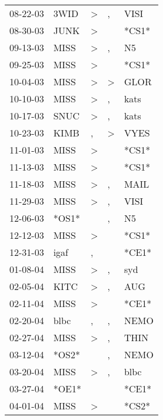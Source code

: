 \begin{supertabular}{lllll}
 08-22-03 &   3WID &     \textgreater &                , &   VISI \\
 08-30-03 &   JUNK &     \textgreater &                  &  *CS1* \\
 09-13-03 &   MISS &     \textgreater &                , &     N5 \\
 09-25-03 &   MISS &     \textgreater &                  &  *CS1* \\
 10-04-03 &   MISS &     \textgreater &     \textgreater &   GLOR \\
 10-10-03 &   MISS &     \textgreater &                , &   kats \\
 10-17-03 &   SNUC &     \textgreater &                , &   kats \\
 10-23-03 &   KIMB &                , &     \textgreater &   VYES \\
 11-01-03 &   MISS &     \textgreater &                  &  *CS1* \\
 11-13-03 &   MISS &     \textgreater &                  &  *CS1* \\
 11-18-03 &   MISS &     \textgreater &                , &   MAIL \\
 11-29-03 &   MISS &     \textgreater &                , &   VISI \\
 12-06-03 &  *OS1* &                  &                , &     N5 \\
 12-12-03 &   MISS &     \textgreater &                  &  *CS1* \\
 12-31-03 &   igaf &                , &                  &  *CE1* \\
 01-08-04 &   MISS &     \textgreater &                , &    syd \\
 02-05-04 &   KITC &     \textgreater &                , &    AUG \\
 02-11-04 &   MISS &     \textgreater &                  &  *CE1* \\
 02-20-04 &   blbc &                , &                , &   NEMO \\
 02-27-04 &   MISS &     \textgreater &                , &   THIN \\
 03-12-04 &  *OS2* &                  &                , &   NEMO \\
 03-20-04 &   MISS &     \textgreater &                , &   blbc \\
 03-27-04 &  *OE1* &                  &                  &  *CE1* \\
 04-01-04 &   MISS &     \textgreater &                  &  *CS2* \\

\end{supertabular}
